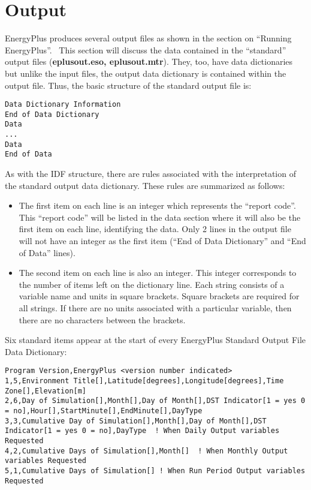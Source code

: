 \chapter{Output}\label{output}

EnergyPlus produces several output files as shown in the section on ``Running EnergyPlus''.~ This section will discuss the data contained in the ``standard'' output files (\textbf{eplusout.eso, eplusout.mtr}). They, too, have data dictionaries but unlike the input files, the output data dictionary is contained within the output file. Thus, the basic structure of the standard output file is:

\begin{lstlisting}
Data Dictionary Information
End of Data Dictionary
Data
...
Data
End of Data
\end{lstlisting}

As with the IDF structure, there are rules associated with the interpretation of the standard output data dictionary. These rules are summarized as follows:

\begin{itemize}
\item
  The first item on each line is an integer which represents the ``report code''. This ``report code'' will be listed in the data section where it will also be the first item on each line, identifying the data. Only 2 lines in the output file will not have an integer as the first item (``End of Data Dictionary'' and ``End of Data'' lines).
\item
  The second item on each line is also an integer. This integer corresponds to the number of items left on the dictionary line. Each string consists of a variable name and units in square brackets. Square brackets are required for all strings. If there are no units associated with a particular variable, then there are no characters between the brackets.
\end{itemize}

Six standard items appear at the start of every EnergyPlus Standard Output File Data Dictionary:

\begin{lstlisting}
Program Version,EnergyPlus <version number indicated>
1,5,Environment Title[],Latitude[degrees],Longitude[degrees],Time Zone[],Elevation[m]
2,6,Day of Simulation[],Month[],Day of Month[],DST Indicator[1 = yes 0 = no],Hour[],StartMinute[],EndMinute[],DayType
3,3,Cumulative Day of Simulation[],Month[],Day of Month[],DST Indicator[1 = yes 0 = no],DayType  ! When Daily Output variables Requested
4,2,Cumulative Days of Simulation[],Month[]  ! When Monthly Output variables Requested
5,1,Cumulative Days of Simulation[] ! When Run Period Output variables Requested
\end{lstlisting}

